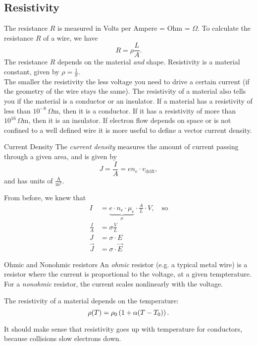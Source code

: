 \documentclass[class=article, crop=false]{standalone}
\begin{document}
  \subsection{Resistivity}
  The resistance $R$ is measured in Volts per Ampere = Ohm = $\Omega$. To calculate the resistance $R$ of a wire, we have
  \[
    \boxed{R = \rho \frac{L}{A}.}
  \]
  The resistance $R$ depends on the material \emph{and} shape. Resistivity is a material constant, given by $\rho = \frac{1}{\sigma}$. \\[10pt]
  The smaller the resistivity the less voltage you need to drive a certain current (if the geometry of the wire stays the same). The resistivity of a material also tells you if the material is a conductor or an insulator. If a material has a resistivity of less than $10^{-8}\,\Omega \mathrm{m}$, then it is a conductor. If it has a resistivity of more than $10^{16}\,\Omega \mathrm{m}$, then it is an insulator.
  If electron flow depends on space or is not confined to a well defined wire it is more useful to define a vector current density.
  \begin{definition}{Current Density}
    The \emph{current density} measures the amount of current passing through a given area, and is given by
    \[
      J = \frac{I}{A} = en_e\cdot v_{\text{drift}},
    \]
    and has units of $\frac{\text{A}}{\text{m}^2}$.
  \end{definition}
  From before, we knew that
  \begin{align*}
    I &= \underbrace{e\cdot n_e\cdot \mu_e}_{\sigma}\cdot \frac{A}{L}\cdot V, \quad\text{so} \\ 
    \frac{I}{A} &= \sigma \frac{V}{L} \\
    J &= \sigma\cdot E \\
    \vec{J} &= \sigma\cdot \vec{E}
  \end{align*}
  \begin{definition}{Ohmic and Nonohmic resistors}
    An \emph{ohmic} resistor (e.g. a typical metal wire) is a resistor where the current is proportional to the voltage, at a given tempterature. For a \emph{nonohmic} resistor, the current scales nonlinearly with the voltage.
  \end{definition}
  The resistivity of a material depends on the temperature:
  \[
    \rho(T) = \rho_0 \left( 1 + \alpha(T - T_0) \right).
  \]
  \begin{note}{}
    It should make sense that resistivity goes up with temperature for conductors, because collisions slow electrons down.
  \end{note}
\end{document}
